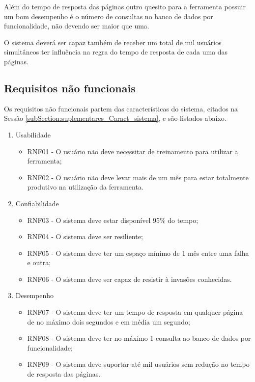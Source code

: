 	Além do tempo de resposta das páginas outro quesito para a ferramenta possuir um bom desempenho é o número de consultas no banco de dados por funcionalidade, não devendo ser maior que uma.

	O sistema deverá ser capaz também de receber um total de mil usuários simultâneos ter influência na regra do tempo de resposta de cada uma das páginas.

\subsection{Requisitos não funcionais}

	Os requisitos não funcionais partem das características do sistema, citados na Sessão \ref{subSection:suplementares_Caract_sistema}, e são listados abaixo. 

	\begin{enumerate}
		\item Usabilidade
			\begin{itemize}
				\item RNF01 - O usuário não deve necessitar de treinamento para utilizar a ferramenta;
				\item RNF02 - O usuário não deve levar mais de um mês para estar totalmente produtivo na utilização da ferramenta.
			\end{itemize}
		\item Confiabilidade
			\begin{itemize}
				\item RNF03 - O sistema deve estar disponível 95\% do tempo;
				\item RNF04 - O sistema deve ser resiliente;
				\item RNF05 - O sistema deve ter um espaço mínimo de 1 mês entre uma falha e outra;
				\item RNF06 - O sistema deve ser capaz de resistir à invasões conhecidas.
			\end{itemize}
		\item Desempenho
			\begin{itemize}
				\item RNF07 - O sistema deve ter um tempo de resposta em qualquer página de no máximo dois segundos e em média um segundo;
				\item RNF08 - O sistema deve ter no máximo 1 consulta ao banco de dados por funcionalidade;
				\item RNF09 - O sistema deve suportar até mil usuários sem redução no tempo de resposta das páginas.
			\end{itemize}
	\end{enumerate}
